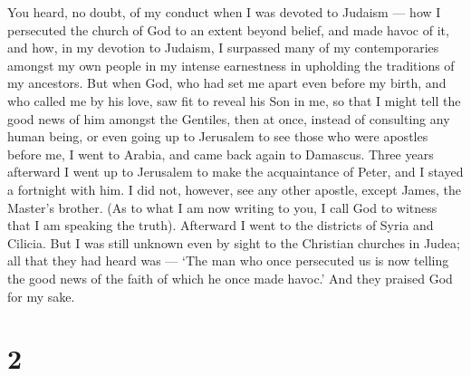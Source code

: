 You heard, no doubt, of my conduct when I was devoted to
Judaism --- how I persecuted the church of God to an extent beyond
belief, and made havoc of it,  and how, in my devotion to
Judaism, I surpassed many of my contemporaries amongst my own people in
my intense earnestness in upholding the traditions of my ancestors.
 But when God, who had set me apart even before my birth,
and who called me by his love,  saw fit to reveal his Son
in me, so that I might tell the good news of him amongst the Gentiles,
then at once, instead of consulting any human being,  or
even going up to Jerusalem to see those who were apostles before me, I
went to Arabia, and came back again to Damascus.  Three
years afterward I went up to Jerusalem to make the acquaintance of
Peter, and I stayed a fortnight with him.  I did not,
however, see any other apostle, except James, the Master's brother.
 (As to what I am now writing to you, I call God to witness
that I am speaking the truth).  Afterward I went to the
districts of Syria and Cilicia.  But I was still unknown
even by sight to the Christian churches in Judea;  all that
they had heard was --- `The man who once persecuted us is now telling
the good news of the faith of which he once made havoc.' 
And they praised God for my sake.

\hypertarget{section-1}{%
\section{2}\label{section-1}}

